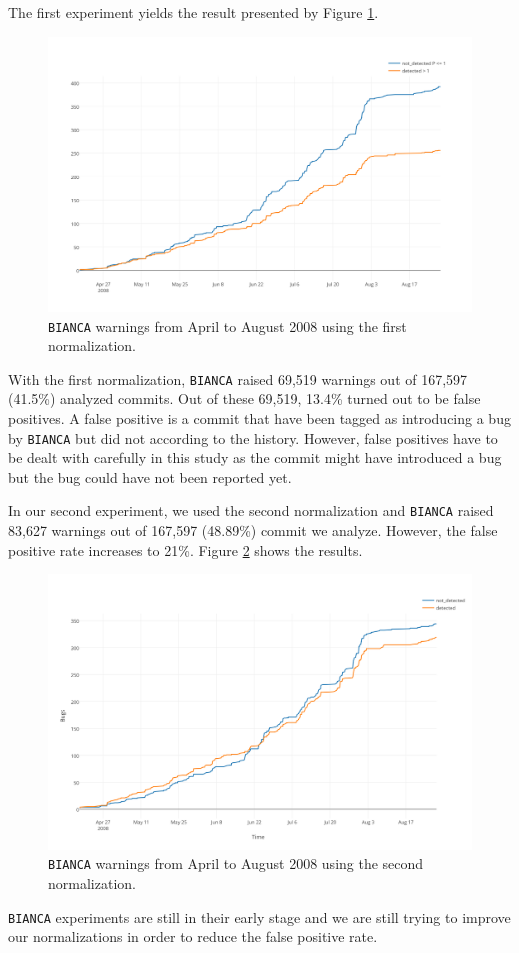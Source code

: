 The first experiment yields the result presented by Figure \ref{fig:bianca-exp-1}.

\begin{figure}[h!]
  \centering
    \includegraphics[scale=0.55]{media/bianca-13.png}
    \caption{{\tt BIANCA} warnings from April to August 2008 using the first normalization.
    \label{fig:bianca-exp-1}}
\end{figure}

With the first normalization, {\tt BIANCA} raised 69,519 warnings out of 167,597 (41.5\%) analyzed commits.
Out of these 69,519, 13.4\% turned out to be false positives. A false positive is a commit that have been tagged as introducing a bug by {\tt BIANCA} but did not according to the history.
However, false positives have to be dealt with carefully in this study as the commit might have introduced a bug but the bug could have not been reported yet.

In our second experiment, we used the second normalization and {\tt BIANCA} raised 83,627 warnings out of 167,597 (48.89\%) commit we analyze. However, the false positive rate increases to 21\%. Figure \ref{fig:bianca-exp-2} shows the results.

\begin{figure}[h!]
  \centering
    \includegraphics[scale=0.55]{media/bianca-20.png}
    \caption{{\tt BIANCA} warnings from April to August 2008 using the second normalization.
    \label{fig:bianca-exp-2}}
\end{figure}

{\tt BIANCA} experiments are still in their early stage and we are still trying to improve our normalizations in order to reduce the false positive rate.
